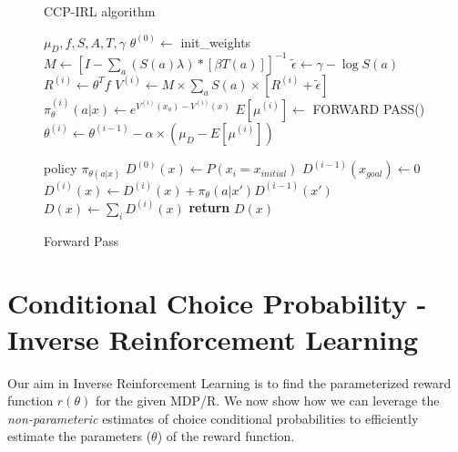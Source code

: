 \documentclass{article}
\begin{document}
\begin{figure}[ht]
\begin{minipage}[t]{0.45\textwidth}
  \begin{algorithm}[H]
    \caption{CCP-IRL algorithm} \label{algo:ccp_irl_algorithm}
    \begin{algorithmic}[1]
         $\mu_D,f, S, A, T, \gamma$
        \STATE $\theta^{(0)} \gets$ init\_weights
        \STATE $M \gets \left[I-\sum_{a}(S(a) \lambda) *\left[ \beta T(a)  \right]\right]^{-1}$ 
        \STATE $\tilde{\epsilon} \gets \gamma - \log S(a)$
            \STATE $R^{(i)} \gets \theta^T f$
            \STATE $V^{(i)} \gets M \times \sum_{a}{S(a) \times \left[ R^{(i)} +\tilde{\epsilon}\right]}$
            \STATE $\pi_{\theta}^{(i)}(a|x) \gets e^{V^{(i)}(x_a) - V^{(i)}(x)}$
            \STATE $E[\mu^{(i)}] \gets $ FORWARD PASS()
            \STATE $\theta^{(i)} \gets \theta^{(i-1)} - \alpha \times (\mu_D - E[\mu^{(i)}])$
        \ENDFOR
    \end{algorithmic}
  \end{algorithm}
\end{minipage}%
\qquad
\begin{minipage}[t]{0.45\textwidth}
  \begin{algorithm}[H]
    \caption{Forward Pass} \label{algo:forward_pass_algorithm}
    \begin{algorithmic}[1]
         policy $\pi_{\theta(a|x)}$
        \STATE $D^{(0)}(x) \gets P(x_i = x_{initial})$
            \STATE $D^{(i-1)}(x_{goal}) \gets 0$
            \STATE $D^{(i)}(x) \gets D^{(i)}(x) + \pi_{\theta}(a|x') D^{(i-1)}(x')$
        \ENDFOR
        \STATE $D(x) \gets \sum_{i}D^{(i)}(x)$ 
        \STATE \textbf{return} $D(x)$
    \end{algorithmic}
  \end{algorithm}
\end{minipage}
\end{figure}


\section{Conditional Choice Probability - Inverse Reinforcement Learning}

Our aim in Inverse Reinforcement Learning is to find the parameterized reward function $r(\theta)$ for the given MDP/R. We now show how we can leverage the \textit{non-parameteric} estimates of choice conditional probabilities to efficiently estimate the parameters ($\theta$) of the reward function. 
\end{document}
